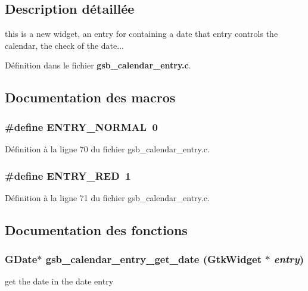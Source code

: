 \subsection{Description détaillée}
this is a new widget, an entry for containing a date that entry controls the calendar, the check of the date... 

Définition dans le fichier {\bf gsb\_\-calendar\_\-entry.c}.



\subsection{Documentation des macros}
\subsubsection[{ENTRY\_\-NORMAL}]{\setlength{\rightskip}{0pt plus 5cm}\#define ENTRY\_\-NORMAL~0}\label{gsb__calendar__entry_8c_a6ff530bf21012339bb9eea5bd946f743}


Définition à la ligne 70 du fichier gsb\_\-calendar\_\-entry.c.

\subsubsection[{ENTRY\_\-RED}]{\setlength{\rightskip}{0pt plus 5cm}\#define ENTRY\_\-RED~1}\label{gsb__calendar__entry_8c_a0818bec2568e949d41dc235bf36a2568}


Définition à la ligne 71 du fichier gsb\_\-calendar\_\-entry.c.



\subsection{Documentation des fonctions}
\subsubsection[{gsb\_\-calendar\_\-entry\_\-get\_\-date}]{\setlength{\rightskip}{0pt plus 5cm}GDate$\ast$ gsb\_\-calendar\_\-entry\_\-get\_\-date (GtkWidget $\ast$ {\em entry})}\label{gsb__calendar__entry_8c_a8cb2e700394a337d8442f42cfdb311ef}
get the date in the date entry


